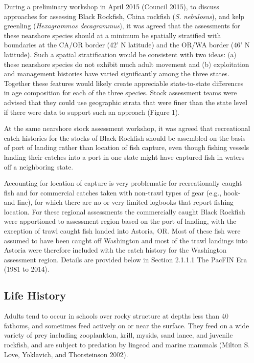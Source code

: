 \documentclass[11pt,
  english,
  letterpaper,
]{article}
\begin{document}
During a preliminary workshop in April 2015 (Council 2015), to discuss approaches for assessing Black Rockfish, China rockfish (\emph{S. nebulosus}), and kelp greenling (\emph{Hexagrammos decagrammus}), it was agreed that the assessments for these nearshore species should at a minimum be spatially stratified with boundaries at the CA/OR border (42' N latitude) and the OR/WA border (46' N latitude). Such a spatial stratification would be consistent with two ideas: (a) these nearshore species do not exhibit much adult movement and (b) exploitation and management histories have varied significantly among the three states. Together these features would likely create appreciable state-to-state differences in age composition for each of the three species. Stock assessment teams were advised that they could use geographic strata that were finer than the state level if there were data to support such an approach (Figure 1).

At the same nearshore stock assessment workshop, it was agreed that recreational catch histories for the stocks of Black Rockfish should be assembled on the basis of port of landing rather than location of fish capture, even though fishing vessels landing their catches into a port in one state might have captured fish in waters off a neighboring state.

Accounting for location of capture is very problematic for recreationally caught fish and for commercial catches taken with non-trawl types of gear (e.g., hook-and-line), for which there are no or very limited logbooks that report fishing location. For these regional assessments the commercially caught Black Rockfish were apportioned to assessment region based on the port of landing, with the exception of trawl caught fish landed into Astoria, OR. Most of these fish were assumed to have been caught off Washington and most of the trawl landings into Astoria were therefore included with the catch history for the Washington assessment region. Details are provided below in Section 2.1.1.1 The PacFIN Era (1981 to 2014).

\hypertarget{life-history}{%
\subsection{Life History}\label{life-history}}

Adults tend to occur in schools over rocky structure at depths less than 40 fathoms, and sometimes feed actively on or near the surface. They feed on a wide variety of prey including zooplankton, krill, mysids, sand lance, and juvenile rockfish, and are subject to predation by lingcod and marine mammals (Milton S. Love, Yoklavich, and Thorsteinson 2002).
\end{document}
